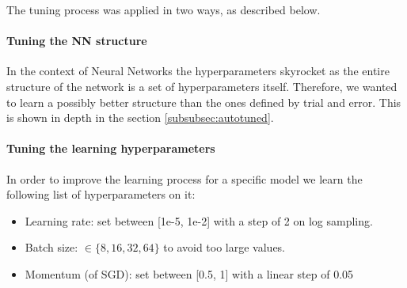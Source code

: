The tuning process was applied in two ways, as described below.

\paragraph{Tuning the NN structure}
In the context of Neural Networks the hyperparameters skyrocket as the entire structure of the network is a set of hyperparameters itself.
Therefore, we wanted to learn a possibly better structure than the ones defined by trial and error.
This is shown in depth in the section \ref{subsubsec:autotuned}.

\paragraph{Tuning the learning hyperparameters}
In order to improve the learning process for a specific model we learn the following list of hyperparameters on it:
\begin{itemize}
    \item Learning rate: set between [1e-5, 1e-2] with a step of 2 on log sampling.
    \item Batch size:  $\in \{8, 16, 32, 64\}$ to avoid too large values.
    \item Momentum (of SGD): set between [0.5, 1] with a linear step of 0.05
\end{itemize}